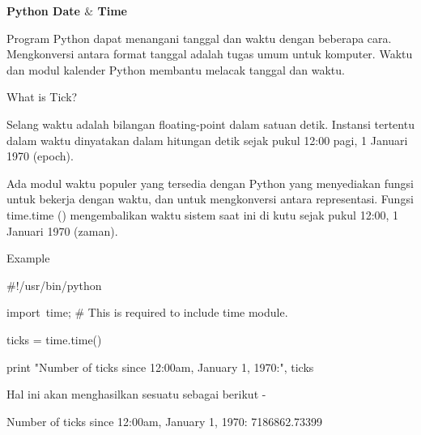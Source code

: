 
\sloppy
\begin{center}{\fontsize{16pt}{16pt}\selectfont \textbf{Python Date  $  \&  $ Time} \\}\end{center} \par
\vspace{12pt}
\vspace{12pt}
\noindent 
 \hspace*{0.5in} Program Python dapat menangani tanggal dan waktu dengan beberapa cara. Mengkonversi antara format tanggal adalah tugas umum untuk komputer. Waktu dan modul kalender Python membantu melacak tanggal dan waktu. \par
\vspace{12pt}
\noindent 
What is Tick? \par
\noindent 
Selang waktu adalah bilangan floating-point dalam satuan detik. Instansi tertentu dalam waktu dinyatakan dalam hitungan detik sejak pukul 12:00 pagi, 1 Januari 1970 (epoch). \par
\noindent 
Ada modul waktu populer yang tersedia dengan Python yang menyediakan fungsi untuk bekerja dengan waktu, dan untuk mengkonversi antara representasi. Fungsi time.time () mengembalikan waktu sistem saat ini di kutu sejak pukul 12:00, 1 Januari 1970 (zaman). \par
\vspace{12pt}
\noindent 
Example \par
\vspace{12pt}
\noindent 
 \hspace*{0.5in}  $  \#  $!/usr/bin/python \par
\noindent 
 \hspace*{0.5in} import~time;   $  \#  $ This is required to include time module. \par
\vspace{12pt}
\noindent 
 \hspace*{0.5in} ticks = time.time() \par
\noindent 
 \hspace*{0.5in} print "Number of ticks since 12:00am, January 1, 1970:", ticks \par
\vspace{12pt}
\noindent 
Hal ini akan menghasilkan sesuatu sebagai berikut - \par
\noindent 
 \hspace*{0.5in} Number of ticks since 12:00am, January 1, 1970: 7186862.73399 \par
\vspace{12pt}
